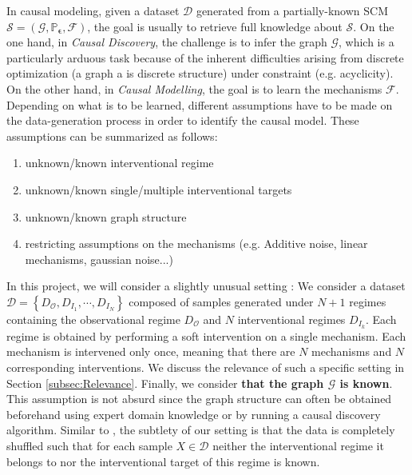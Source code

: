 \documentclass{article}
\begin{document}
In causal modeling, given a dataset $\mathcal{D}$ generated from a
partially-known SCM $\mathcal{S}= (\mathcal{G},
    \mathbb{P}_{\boldsymbol{\epsilon}}, \mathcal{F})$, the goal is usually to
retrieve full knowledge about $\mathcal{S}$. On the one hand, in \textit{Causal
    Discovery}, the challenge is to infer the graph $\mathcal{G}$, which is a
particularly arduous task because of the inherent difficulties arising from
discrete optimization (a graph a is discrete structure) under constraint (e.g.
acyclicity). On the other hand, in \textit{Causal Modelling}, the goal is to
learn the mechanisms $\mathcal{F}$. Depending on what is to be learned,
different assumptions have to be made on the data-generation process in order
to identify the causal model. These assumptions can be summarized as follows:
\begin{enumerate}
    \item unknown/known interventional regime
    \item unknown/known single/multiple interventional targets
    \item unknown/known graph structure
    \item restricting assumptions on the mechanisms (e.g. Additive noise, linear
          mechanisms, gaussian noise...)
\end{enumerate}

In this project, we will consider a slightly unusual setting : We consider a
dataset $\mathcal{D} = \left\{ D_{\mathcal{O}},D_{I_1}, \cdots, D_{I_N}
    \right\}$ composed of samples generated under $N+1$ regimes containing the
observational regime $D_{\mathcal{O}}$ and $N$ interventional regimes
$D_{I_k}$. Each regime is obtained by performing a soft intervention on a
single mechanism. Each mechanism is intervened only once, meaning that there
are $N$ mechanisms and $N$ corresponding interventions. We discuss the
relevance of such a specific setting in Section \ref{subsec:Relevance}.
Finally, we consider \textbf{that the graph $\mathcal{G}$ is known}. This
assumption is not absurd since the graph structure can often be obtained
beforehand using expert domain knowledge or by running a causal discovery
algorithm. Similar to \cite{faria_differentiable_2022}, the subtlety of our
setting is that the data is completely shuffled such that for each sample $X
    \in \mathcal{D}$ neither the interventional regime it belongs to nor the
interventional target of this regime is known.
\end{document}
